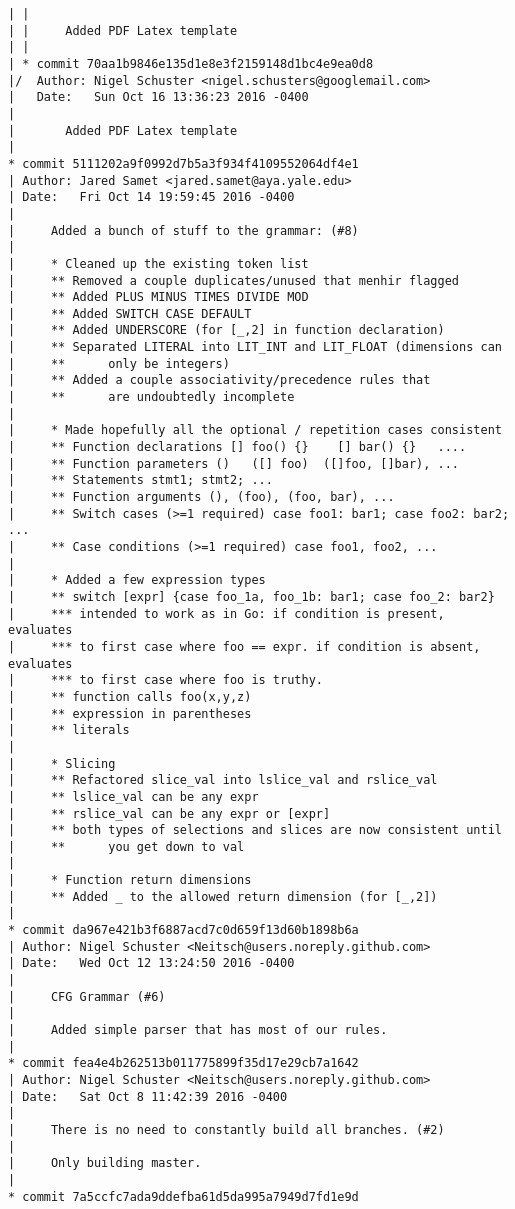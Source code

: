 \begin{lstlisting}
| |     
| |     Added PDF Latex template
| |   
| * commit 70aa1b9846e135d1e8e3f2159148d1bc4e9ea0d8
|/  Author: Nigel Schuster <nigel.schusters@googlemail.com>
|   Date:   Sun Oct 16 13:36:23 2016 -0400
|   
|       Added PDF Latex template
|  
* commit 5111202a9f0992d7b5a3f934f4109552064df4e1
| Author: Jared Samet <jared.samet@aya.yale.edu>
| Date:   Fri Oct 14 19:59:45 2016 -0400
| 
|     Added a bunch of stuff to the grammar: (#8)
|     
|     * Cleaned up the existing token list
|     ** Removed a couple duplicates/unused that menhir flagged
|     ** Added PLUS MINUS TIMES DIVIDE MOD
|     ** Added SWITCH CASE DEFAULT
|     ** Added UNDERSCORE (for [_,2] in function declaration)
|     ** Separated LITERAL into LIT_INT and LIT_FLOAT (dimensions can
|     **      only be integers)
|     ** Added a couple associativity/precedence rules that
|     **      are undoubtedly incomplete
|     
|     * Made hopefully all the optional / repetition cases consistent
|     ** Function declarations [] foo() {}    [] bar() {}   ....
|     ** Function parameters ()   ([] foo)  ([]foo, []bar), ...
|     ** Statements stmt1; stmt2; ...
|     ** Function arguments (), (foo), (foo, bar), ...
|     ** Switch cases (>=1 required) case foo1: bar1; case foo2: bar2; ...
|     ** Case conditions (>=1 required) case foo1, foo2, ...
|     
|     * Added a few expression types
|     ** switch [expr] {case foo_1a, foo_1b: bar1; case foo_2: bar2}
|     *** intended to work as in Go: if condition is present, evaluates
|     *** to first case where foo == expr. if condition is absent, evaluates
|     *** to first case where foo is truthy.
|     ** function calls foo(x,y,z)
|     ** expression in parentheses
|     ** literals
|     
|     * Slicing
|     ** Refactored slice_val into lslice_val and rslice_val
|     ** lslice_val can be any expr
|     ** rslice_val can be any expr or [expr]
|     ** both types of selections and slices are now consistent until
|     **      you get down to val
|     
|     * Function return dimensions
|     ** Added _ to the allowed return dimension (for [_,2])
|  
* commit da967e421b3f6887acd7c0d659f13d60b1898b6a
| Author: Nigel Schuster <Neitsch@users.noreply.github.com>
| Date:   Wed Oct 12 13:24:50 2016 -0400
| 
|     CFG Grammar (#6)
|     
|     Added simple parser that has most of our rules.
|  
* commit fea4e4b262513b011775899f35d17e29cb7a1642
| Author: Nigel Schuster <Neitsch@users.noreply.github.com>
| Date:   Sat Oct 8 11:42:39 2016 -0400
| 
|     There is no need to constantly build all branches. (#2)
|     
|     Only building master.
|  
* commit 7a5ccfc7ada9ddefba61d5da995a7949d7fd1e9d

\end{lstlisting}
